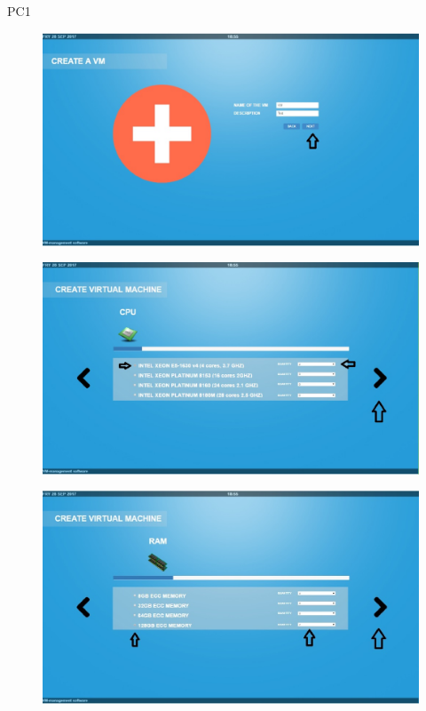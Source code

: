 \begin{lyxlist}{PC1}
\begin{figure}[H]
\centering
\includegraphics[width=170mm]{images/createVMEx3.eps}
\caption{\label{overflow}}
\end{figure}

\begin{figure}[H]
\centering
\includegraphics[width=170mm]{images/createVMEx4.eps}
\caption{\label{overflow}}
\end{figure}

\begin{figure}[H]
\centering
\includegraphics[width=170mm]{images/createVMEx5.eps}
\caption{\label{overflow}}
\end{figure}


\end{lyxlist}
